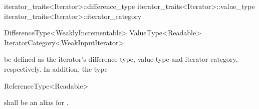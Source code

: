 \begin{removedblock}
\begin{codeblock}
iterator_traits<Iterator>::difference_type
iterator_traits<Iterator>::value_type
iterator_traits<Iterator>::iterator_category
\end{codeblock}
\end{removedblock}
\begin{addedblock}
\begin{codeblock}
DifferenceType<WeaklyIncrementable>
ValueType<Readable>
IteratorCategory<WeakInputIterator>
\end{codeblock}
\end{addedblock}

be defined as the iterator's difference type, value type and iterator category, respectively.
In addition, the type

\begin{addedblock}
\begin{codeblock}
ReferenceType<Readable>
\end{codeblock}

shall be an alias for .
\end{addedblock}

